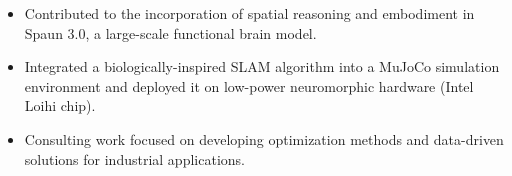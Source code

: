 \documentclass[11pt,a4paper,ragged2e,academicons]{altacv}
\begin{document}
\begin{fullwidth}


\begin{itemize}
    \item Contributed to the incorporation of spatial reasoning and embodiment in Spaun 3.0, a large-scale functional brain model.
\end{itemize}

\divider

\begin{itemize}
    \item Integrated a biologically-inspired SLAM algorithm into a MuJoCo simulation environment and deployed it on low-power neuromorphic hardware (Intel Loihi chip).
\end{itemize}
% 

\divider

 \begin{itemize}
     \item Consulting work focused on developing optimization methods and data-driven solutions for industrial applications.
 \end{itemize}
 \divider


\end{fullwidth}
\end{document}
